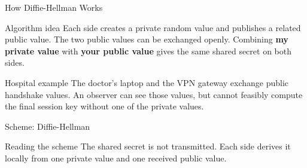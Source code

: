 \documentclass[presentation]{beamer}
\begin{document}
\begin{frame}[c]{How Diffie-Hellman Works}
\begin{block}{Algorithm idea}
Each side creates a private random value and publishes a related public value. The two public values
can be exchanged openly. Combining \textbf{my private value} with \textbf{your public value} gives
the same shared secret on both sides.
\end{block}

\begin{exampleblock}{Hospital example}
The doctor's laptop and the VPN gateway exchange public handshake values. An observer can see those
values, but cannot feasibly compute the final session key without one of the private values.
\end{exampleblock}
\end{frame}

\begin{frame}[c]{Scheme: Diffie-Hellman}
\begin{center}
\end{center}

\begin{block}{Reading the scheme}
The shared secret is not transmitted. Each side derives it locally from one private value and one
received public value.
\end{block}
\end{frame}
\end{document}
